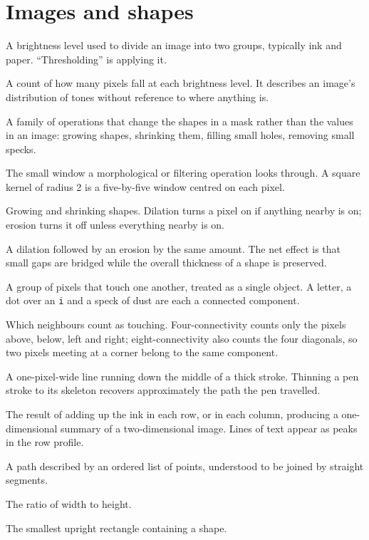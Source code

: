 \documentclass[11pt,a4paper,oneside]{report}
\begin{document}
\section{Images and shapes}
\begin{description}[style=nextline,leftmargin=1.4em]
  \item[Threshold] A brightness level used to divide an image into two
        groups, typically ink and paper. ``Thresholding'' is applying it.
  \item[Histogram] A count of how many pixels fall at each brightness level.
        It describes an image's distribution of tones without reference to
        where anything is.
  \item[Morphology] A family of operations that change the shapes in a mask
        rather than the values in an image: growing shapes, shrinking them,
        filling small holes, removing small specks.
  \item[Structuring element, or kernel] The small window a morphological or
        filtering operation looks through. A square kernel of radius 2 is a
        five-by-five window centred on each pixel.
  \item[Dilation and erosion] Growing and shrinking shapes. Dilation turns a
        pixel on if anything nearby is on; erosion turns it off unless
        everything nearby is on.
  \item[Closing] A dilation followed by an erosion by the same amount. The
        net effect is that small gaps are bridged while the overall thickness
        of a shape is preserved.
  \item[Connected component] A group of pixels that touch one another,
        treated as a single object. A letter, a dot over an \texttt{i} and a
        speck of dust are each a connected component.
  \item[Connectivity] Which neighbours count as touching. Four-connectivity
        counts only the pixels above, below, left and right;
        eight-connectivity also counts the four diagonals, so two pixels
        meeting at a corner belong to the same component.
  \item[Skeleton, or centreline] A one-pixel-wide line running down the
        middle of a thick stroke. Thinning a pen stroke to its skeleton
        recovers approximately the path the pen travelled.
  \item[Projection profile] The result of adding up the ink in each row, or
        in each column, producing a one-dimensional summary of a
        two-dimensional image. Lines of text appear as peaks in the row
        profile.
  \item[Polyline] A path described by an ordered list of points, understood
        to be joined by straight segments.
  \item[Aspect ratio] The ratio of width to height.
  \item[Bounding box] The smallest upright rectangle containing a shape.
\end{description}
\end{document}
